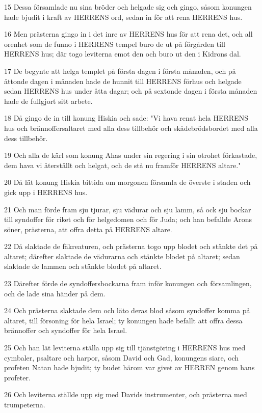 \par 15 Dessa församlade nu sina bröder och helgade sig och gingo, såsom konungen hade bjudit i kraft av HERRENS ord, sedan in för att rena HERRENS hus.
\par 16 Men prästerna gingo in i det inre av HERRENS hus för att rena det, och all orenhet som de funno i HERRENS tempel buro de ut på förgården till HERRENS hus; där togo leviterna emot den och buro ut den i Kidrons dal.
\par 17 De begynte att helga templet på första dagen i första månaden, och på åttonde dagen i månaden hade de hunnit till HERRENS förhus och helgade sedan HERRENS hus under åtta dagar; och på sextonde dagen i första månaden hade de fullgjort sitt arbete.
\par 18 Då gingo de in till konung Hiskia och sade: "Vi hava renat hela HERRENS hus och brännoffersaltaret med alla dess tillbehör och skådebrödsbordet med alla dess tillbehör.
\par 19 Och alla de kärl som konung Ahas under sin regering i sin otrohet förkastade, dem hava vi återställt och helgat, och de stå nu framför HERRENS altare."
\par 20 Då lät konung Hiskia bittida om morgonen församla de överste i staden och gick upp i HERRENS hus.
\par 21 Och man förde fram sju tjurar, sju vädurar och sju lamm, så ock sju bockar till syndoffer för riket och för helgedomen och för Juda; och han befallde Arons söner, prästerna, att offra detta på HERRENS altare.
\par 22 Då slaktade de fäkreaturen, och prästerna togo upp blodet och stänkte det på altaret; därefter slaktade de vädurarna och stänkte blodet på altaret; sedan slaktade de lammen och stänkte blodet på altaret.
\par 23 Därefter förde de syndoffersbockarna fram inför konungen och församlingen, och de lade sina händer på dem.
\par 24 Och prästerna slaktade dem och läto deras blod såsom syndoffer komma på altaret, till försoning för hela Israel; ty konungen hade befallt att offra dessa brännoffer och syndoffer för hela Israel.
\par 25 Och han lät leviterna ställa upp sig till tjänstgöring i HERRENS hus med cymbaler, psaltare och harpor, såsom David och Gad, konungens siare, och profeten Natan hade bjudit; ty budet härom var givet av HERREN genom hans profeter.
\par 26 Och leviterna ställde upp sig med Davids instrumenter, och prästerna med trumpeterna.
